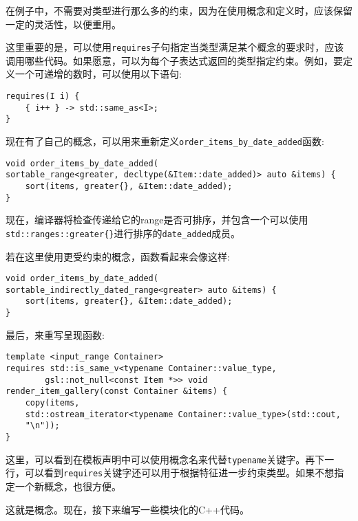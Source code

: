 在例子中，不需要对类型进行那么多的约束，因为在使用概念和定义时，应该保留一定的灵活性，以便重用。

这里重要的是，可以使用\texttt{requires}子句指定当类型满足某个概念的要求时，应该调用哪些代码。如果愿意，可以为每个子表达式返回的类型指定约束。例如，要定义一个可递增的数时，可以使用以下语句:

\begin{lstlisting}[style=styleCXX]
requires(I i) {
	{ i++ } -> std::same_as<I>;
}
\end{lstlisting}

现在有了自己的概念，可以用来重新定义\texttt{order\_items\_by\_date\_added}函数:

\begin{lstlisting}[style=styleCXX]
void order_items_by_date_added(
sortable_range<greater, decltype(&Item::date_added)> auto &items) {
	sort(items, greater{}, &Item::date_added);
}
\end{lstlisting}

现在，编译器将检查传递给它的range是否可排序，并包含一个可以使用\texttt{std::ranges::greater\{\}}进行排序的\texttt{date\_added}成员。

若在这里使用更受约束的概念，函数看起来会像这样:

\begin{lstlisting}[style=styleCXX]
void order_items_by_date_added(
sortable_indirectly_dated_range<greater> auto &items) {
	sort(items, greater{}, &Item::date_added);
}
\end{lstlisting}

最后，来重写呈现函数:

\begin{lstlisting}[style=styleCXX]
template <input_range Container>
requires std::is_same_v<typename Container::value_type,
		gsl::not_null<const Item *>> void
render_item_gallery(const Container &items) {
	copy(items,
	std::ostream_iterator<typename Container::value_type>(std::cout,
	"\n"));
}
\end{lstlisting}

这里，可以看到在模板声明中可以使用概念名来代替\texttt{typename}关键字。再下一行，可以看到\texttt{requires}关键字还可以用于根据特征进一步约束类型。如果不想指定一个新概念，也很方便。

这就是概念。现在，接下来编写一些模块化的C++代码。

